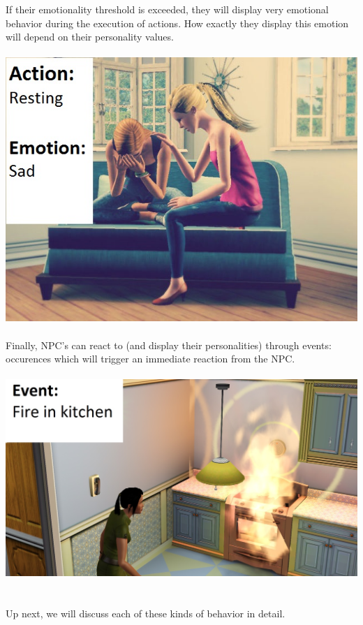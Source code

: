 \documentclass[11pt]{article} %
\begin{document}
\newpage
If their emotionality threshold is exceeded, they will display very emotional behavior during the execution of actions. How exactly they display this emotion will depend on their personality values.
~\\

~\\
\includegraphics[scale=0.5]{SimsCrying}
~\\

Finally, NPC's can react to (and display their personalities) through events: occurences which will trigger an immediate reaction from the NPC.
~\\

~\\
\includegraphics[scale=0.3]{SimsFire}
~\\

~\\
Up next, we will discuss each of these kinds of behavior in detail.
\end{document}
